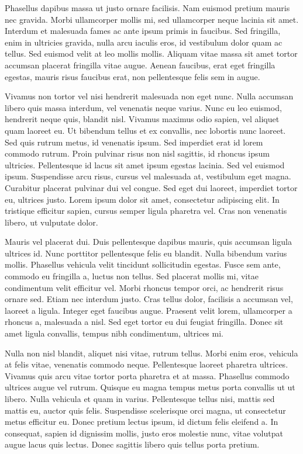 Phasellus dapibus massa ut justo ornare facilisis. Nam euismod pretium
mauris nec gravida. Morbi ullamcorper mollis mi, sed ullamcorper neque
lacinia sit amet. Interdum et malesuada fames ac ante ipsum primis
in faucibus. Sed fringilla, enim in ultricies gravida, nulla arcu
iaculis eros, id vestibulum dolor quam ac tellus. Sed euismod velit
at leo mollis mollis. Aliquam vitae massa sit amet tortor accumsan
placerat fringilla vitae augue. Aenean faucibus, erat eget fringilla
egestas, mauris risus faucibus erat, non pellentesque felis sem in
augue.

Vivamus non tortor vel nisi hendrerit malesuada non eget nunc. Nulla
accumsan libero quis massa interdum, vel venenatis neque varius. Nunc
eu leo euismod, hendrerit neque quis, blandit nisl. Vivamus maximus
odio sapien, vel aliquet quam laoreet eu. Ut bibendum tellus et ex
convallis, nec lobortis nunc laoreet. Sed quis rutrum metus, id venenatis
ipsum. Sed imperdiet erat id lorem commodo rutrum. Proin pulvinar
risus non nisl sagittis, id rhoncus ipsum ultricies. Pellentesque
id lacus sit amet ipsum egestas lacinia. Sed vel euismod ipsum. Suspendisse
arcu risus, cursus vel malesuada at, vestibulum eget magna. Curabitur
placerat pulvinar dui vel congue. Sed eget dui laoreet, imperdiet
tortor eu, ultrices justo. Lorem ipsum dolor sit amet, consectetur
adipiscing elit. In tristique efficitur sapien, cursus semper ligula
pharetra vel. Cras non venenatis libero, ut vulputate dolor.

Mauris vel placerat dui. Duis pellentesque dapibus mauris, quis accumsan
ligula ultrices id. Nunc porttitor pellentesque felis eu blandit.
Nulla bibendum varius mollis. Phasellus vehicula velit tincidunt sollicitudin
egestas. Fusce sem ante, commodo eu fringilla a, luctus non tellus.
Sed placerat mollis mi, vitae condimentum velit efficitur vel. Morbi
rhoncus tempor orci, ac hendrerit risus ornare sed. Etiam nec interdum
justo. Cras tellus dolor, facilisis a accumsan vel, laoreet a ligula.
Integer eget faucibus augue. Praesent velit lorem, ullamcorper a rhoncus
a, malesuada a nisl. Sed eget tortor eu dui feugiat fringilla. Donec
sit amet ligula convallis, tempus nibh condimentum, ultrices mi.

Nulla non nisl blandit, aliquet nisi vitae, rutrum tellus. Morbi enim
eros, vehicula at felis vitae, venenatis commodo neque. Pellentesque
laoreet pharetra ultrices. Vivamus quis arcu vitae tortor porta pharetra
et at massa. Phasellus commodo ultrices augue vel rutrum. Quisque
eu magna tempus metus porta convallis ut ut libero. Nulla vehicula
et quam in varius. Pellentesque tellus nisi, mattis sed mattis eu,
auctor quis felis. Suspendisse scelerisque orci magna, ut consectetur
metus efficitur eu. Donec pretium lectus ipsum, id dictum felis eleifend
a. In consequat, sapien id dignissim mollis, justo eros molestie nunc,
vitae volutpat augue lacus quis lectus. Donec sagittis libero quis
tellus porta pretium.

